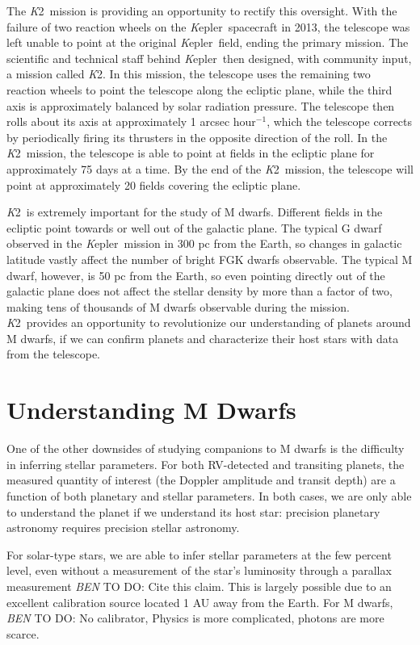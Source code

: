 \documentclass[12pt]{caltech_thesis}
\newcommand{\todo}[3]{{\color{#2} \emph{#1} TO DO: #3}}
\newcommand{\btmtodo}[1]{\todo{BEN}{red}{#1}}
\newcommand{\kep}{{\textit Kepler}}
\newcommand{\KT}{{\textit K2}}
\begin{document}
The \KT\ mission is providing an opportunity to rectify this oversight.
With the failure of two reaction wheels on the \kep\ spacecraft in 2013, the telescope
was left unable to point at the original \kep\ field, ending the primary mission.
The scientific and technical staff behind \kep\ then designed, with community input,
a mission called \KT. 
In this mission, the telescope uses the remaining two reaction wheels to point the telescope
along the ecliptic plane, while the third axis is approximately balanced by solar radiation
pressure.
The telescope then rolls about its axis at approximately 1 arcsec hour$^{-1}$, which 
the telescope corrects by periodically firing its thrusters in the opposite direction
of the roll.
In the \KT\ mission, the telescope is able to point at fields in the ecliptic plane for
approximately 75 days at a time.
By the end of the \KT\ mission, the telescope will point at approximately 20 fields
covering the ecliptic plane.

\KT\ is extremely important for the study of M dwarfs.
Different fields in the ecliptic point towards or well out of the galactic plane.
The typical G dwarf observed in the \kep\ mission in 300 pc from the Earth, so changes
in galactic latitude vastly affect the number of bright FGK dwarfs observable.
The typical M dwarf, however, is 50 pc from the Earth, so even pointing directly out of the
galactic plane does not affect the stellar density by more than a factor of two, making 
tens of thousands of M dwarfs observable during the mission. 
\KT\ provides an opportunity to revolutionize our understanding of planets around M dwarfs,
if we can confirm planets and characterize their host stars with data from the telescope.

\section{Understanding M Dwarfs}
One of the other downsides of studying companions to M dwarfs is the difficulty 
in inferring stellar parameters.
For both RV-detected and transiting planets, the measured quantity of interest 
(the Doppler amplitude and transit depth) are a function of both planetary and stellar
parameters. 
In both cases, we are only able to understand the planet if we understand its host star:
precision planetary astronomy requires precision stellar astronomy.

For solar-type stars, we are able to infer stellar parameters at the few percent level,
even without a measurement of the star's luminosity through a parallax measurement
\btmtodo{Cite this claim}.
This is largely possible due to an excellent calibration source located 1 AU away from the 
Earth.
For M dwarfs, 
\btmtodo{No calibrator, Physics is more complicated, photons are more scarce.}
\end{document}
